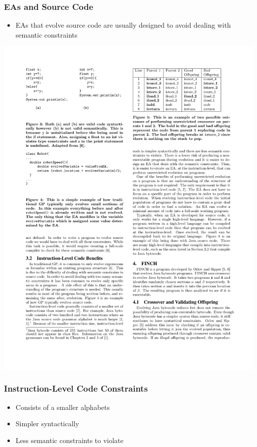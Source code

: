 \documentclass{beamer}
\begin{document}
\begin{frame}
	\frametitle{EAs and Source Code}
	\begin{itemize}
		\item EAs that evolve source code are usually designed to avoid dealing with semantic constraints
	\end{itemize}		
\includegraphics[height=.5\textheight]{Illustrations/traditialGP.pdf}
\end{frame}


\begin{frame}
	\frametitle{Instruction-Level Code Constraints}
	\begin{itemize}
		\item Consists of a smaller alphabets
		\item Simpler syntactically
		\item Less semantic constraints to violate
	\end{itemize}		

\end{frame}
\end{document}

